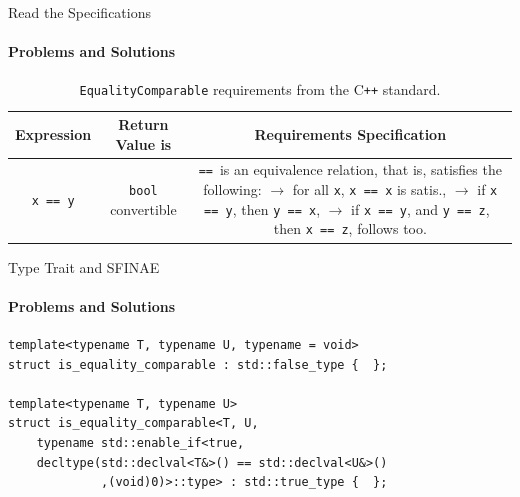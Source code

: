 \documentclass{beamer}
\begin{document}
    \begin{frame}[fragile]{Read the Specifications}
        \framesubtitle{Problems and Solutions}
        \begin{center}
        \begin{table}
        \begin{tabular}{ccc}
            \toprule
            \bf{Expression} & \bf{Return Value is} & \bf{Requirements Specification} \\
            \midrule
            \texttt{x == y} & \texttt{bool} convertible & \makecell[l]{\texttt{==}\, is an equivalence relation,\\
                                                                       that is, satisfies the following:\\
                                                                       $\rightarrow$ for all \texttt{x}, \texttt{x == x} is satis.,\\
                                                                       $\rightarrow$ if \texttt{x == y}, then \texttt{y == x},\\
                                                                       $\rightarrow$ if \texttt{x == y}, and\; \texttt{y == z},\\
                                                                       \;\;\;\, then \texttt{x == z}, follows too.
                                                                       } \\
            \bottomrule
        \end{tabular}
        \caption{\texttt{EqualityComparable} requirements from the C\texttt{++} standard.}
        \end{table}
        \end{center}
    \end{frame}

    \begin{frame}[fragile]{Type Trait and SFINAE}
        \framesubtitle{Problems and Solutions}
        \begin{center}
        \begin{lstlisting}[caption={expressing \texttt{EqualityComparable} as a SFINAE type trait.}]
template<typename T, typename U, typename = void>
struct is_equality_comparable : std::false_type {  };

template<typename T, typename U>
struct is_equality_comparable<T, U,
    typename std::enable_if<true,
    decltype(std::declval<T&>() == std::declval<U&>()
             ,(void)0)>::type> : std::true_type {  };\end{lstlisting}
        \end{center}
    \end{frame}
\end{document}
